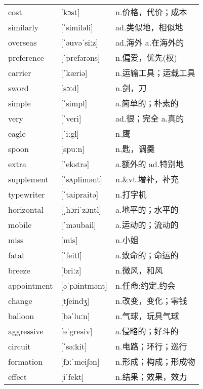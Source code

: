 \documentclass[a4paper]{article}
\begin{document}
\section{}
\begin{tabular}{l l l}

cost & [kɔst] & n.价格，代价；成本 \\
similarly & [ˈsimiləli] & ad.类似地，相似地 \\
overseas & [ˈəuvəˈsiːz] & ad.海外 a.在海外的 \\
preference & [ˈprefərəns] & n.偏爱，优先(权) \\
carrier & [ˈkæriə] & n.运输工具；运载工具 \\
sword & [sɔːd] & n.剑，刀 \\
simple & [ˈsimpl] & a.简单的；朴素的 \\
very & [ˈveri] & ad.很；完全 a.真的 \\
eagle & [ˈiːgl] & n.鹰 \\
spoon & [spuːn] & n.匙，调羹 \\
extra & [ˈekstrə] & a.额外的 ad.特别地 \\
supplement & [ˈsʌplimənt] & n.\&vt.增补，补充 \\
typewriter & [ˈtaipraitə] & n.打字机 \\
horizontal & [ˌhɔriˈzɔntl] & a.地平的；水平的 \\
mobile & [ˈməubail] & a.运动的；流动的 \\
miss & [mis] & n.小姐 \\
fatal & [ˈfeitl] & a.致命的；命运的 \\
breeze & [briːz] & n.微风，和风 \\
appointment & [əˈpɔintmənt] & n.任命;约定,约会 \\
change & [t∫eindʒ] & n.改变，变化；零钱 \\
balloon & [bəˈluːn] & n.气球，玩具气球 \\
aggressive & [əˈgresiv] & a.侵略的；好斗的 \\
circuit & [ˈsəːkit] & n.电路；环行；巡行 \\
formation & [fɔːˈmei∫ən] & n.形成；构成；形成物 \\
effect & [iˈfekt] & n.结果；效果，效力 \\

\end{tabular}
\end{document}
